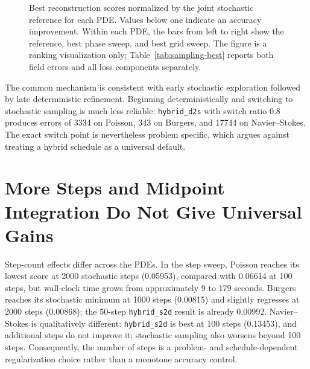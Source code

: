 \documentclass[twoside,11pt]{article}
\newcommand{\hsd}{\texttt{hybrid\_s2d}}
\newcommand{\hds}{\texttt{hybrid\_d2s}}
\begin{document}
\begin{figure}[t]
\centering
{}
\caption{Best reconstruction scores normalized by the joint stochastic
reference for each PDE.  Values below one indicate an accuracy improvement.
Within each PDE, the bars from left to right show the reference, best phase
sweep, and best grid sweep.
The figure is a ranking visualization only; Table~\ref{tab:sampling-best}
reports both field errors and all loss components separately.}
\label{fig:sampling-normalized}
\end{figure}

The common mechanism is consistent with early stochastic exploration followed
by late deterministic refinement.  Beginning deterministically and switching
to stochastic sampling is much less reliable: \hds{} with switch ratio 0.8
produces errors of 3334 on Poisson, 343 on Burgers, and 17744 on
Navier--Stokes.  The exact switch point is nevertheless problem specific,
which argues against treating a hybrid schedule as a universal default.

\section{More Steps and Midpoint Integration Do Not Give Universal Gains}
\label{sec:discretization}

Step-count effects differ across the PDEs.  In the step sweep, Poisson reaches
its lowest score at 2000 stochastic steps (0.05953), compared with 0.06614 at
100 steps, but wall-clock time grows from approximately 9 to 179 seconds.
Burgers reaches its stochastic minimum at 1000 steps (0.00815) and slightly
regresses at 2000 steps (0.00868); the 50-step \hsd{} result is already
0.00992.  Navier--Stokes is qualitatively different: \hsd{} is best at 100
steps (0.13453), and additional steps do not improve it; stochastic sampling
also worsens beyond 100 steps.  Consequently, the number of steps is a
problem- and schedule-dependent regularization choice rather than a monotone
accuracy control.
\end{document}
